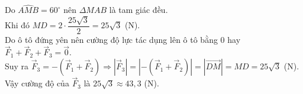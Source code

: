 \begin{bt}
{		Do  $\widehat{AMB}=60^\circ$ nên $\Delta MAB$ là tam giác đều. \\Khi đó $MD=2\cdot \dfrac{25\sqrt{3}}{2}=25\sqrt{3}$ (N).\\
		Do ô tô đứng yên nên cường độ lực tác dụng lên ô tô bằng $0$  hay $\overrightarrow{F}_1+\overrightarrow{F}_2+\overrightarrow{F}_3=\overrightarrow{0}$.\\
		Suy  ra
		$\overrightarrow{F}_3=-(\overrightarrow{F}_1+\overrightarrow{F}_2) 
		\Rightarrow \left|\overrightarrow{F}_3\right|=\left| -(\overrightarrow{F}_1+\overrightarrow{F}_2)\right| 
		=\left|\overrightarrow{DM}\right|=MD=25\sqrt{3}$ (N).\\ 
		Vậy cường độ của $\overrightarrow{F}_3$ là $25\sqrt{3}\approx  43{,}3$ (N).
	 }
\end{bt}

